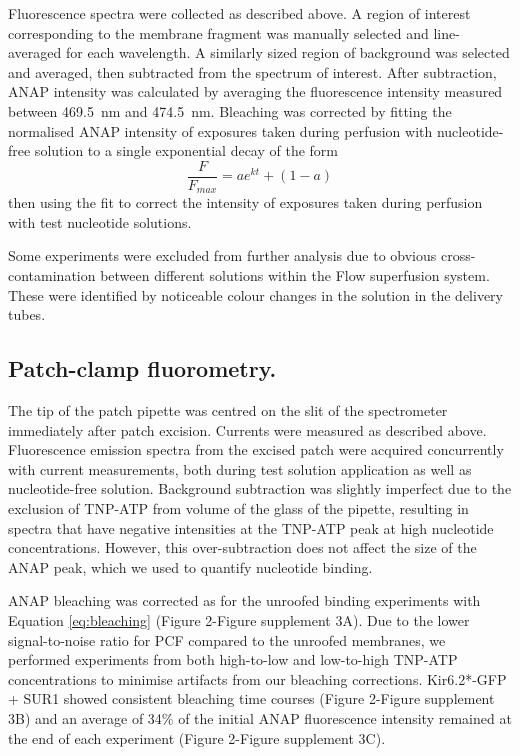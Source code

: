 \documentclass[10pt,lineno, doublespacing]{elife}
\begin{document}
Fluorescence spectra were collected as described above.
A region of interest corresponding to the membrane fragment was manually selected and line-averaged for each wavelength.
A similarly sized region of background was selected and averaged, then subtracted from the spectrum of interest.
After subtraction, ANAP intensity was calculated by averaging the fluorescence intensity measured between \SI{469.5}{\nano\metre} and \SI{474.5}{\nano\metre}.
Bleaching was corrected by fitting the normalised ANAP intensity of exposures taken during perfusion with nucleotide-free solution to a single exponential decay of the form
\begin{equation} \label{eq:bleaching}
    \frac{F}{F_{max}} = ae^{kt} + (1 - a)
\end{equation}
then using the fit to correct the intensity of exposures taken during perfusion with test nucleotide solutions.

Some experiments were excluded from further analysis due to obvious cross-contamination between different solutions within the \si{\micro}Flow superfusion system.
These were identified by noticeable colour changes in the solution in the delivery tubes.

\subsection{Patch-clamp fluorometry.}
The tip of the patch pipette was centred on the slit of the spectrometer immediately after patch excision.
Currents were measured as described above.
Fluorescence emission spectra from the excised patch were acquired concurrently with current measurements, both during test solution application as well as nucleotide-free solution.
Background subtraction was slightly imperfect due to the exclusion of TNP-ATP from volume of the glass of the pipette, resulting in spectra that have negative intensities at the TNP-ATP peak at high nucleotide concentrations.
However, this over-subtraction does not affect the size of the ANAP peak, which we used to quantify nucleotide binding.

ANAP bleaching was corrected as for the unroofed binding experiments with Equation \ref{eq:bleaching} (Figure 2-Figure supplement 3A).
Due to the lower signal-to-noise ratio for PCF compared to the unroofed membranes, we performed experiments from both high-to-low and low-to-high TNP-ATP concentrations to minimise artifacts from our bleaching corrections.
Kir6.2*-GFP + SUR1 showed consistent bleaching time courses (Figure 2-Figure supplement 3B) and an average of 34\% of the initial ANAP fluorescence intensity remained at the end of each experiment (Figure 2-Figure supplement 3C).
\end{document}
